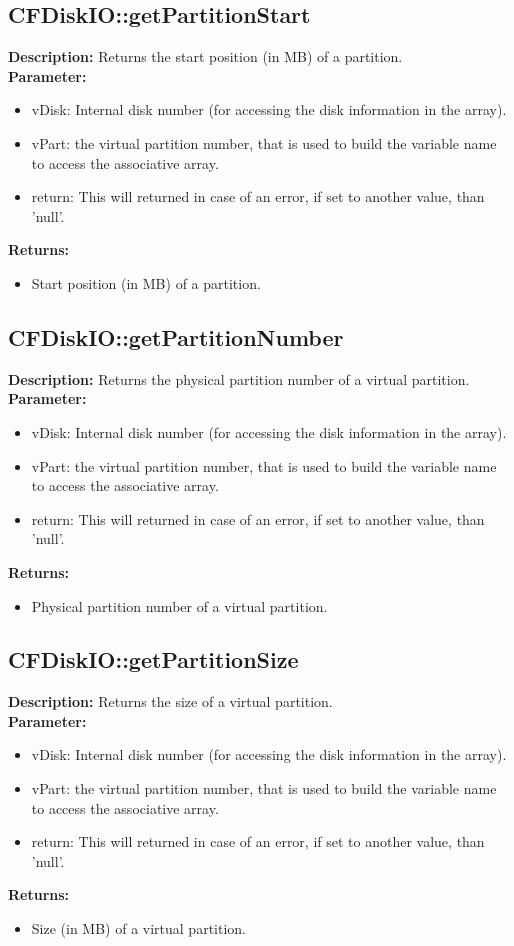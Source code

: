 \subsection{CFDiskIO::getPartitionStart}
\textbf{Description:} Returns the start position (in MB) of a partition.\\
\textbf{Parameter:}
\begin{itemize}
\item vDisk: Internal disk number (for accessing the disk information in the array).
\item vPart: the virtual partition number, that is used to build the variable name to access the associative array.
\item return: This will returned in case of an error, if set to another value, than 'null'.
\end{itemize}
\textbf{Returns:}
\begin{itemize}
\item Start position (in MB) of a partition.
\end{itemize}

\subsection{CFDiskIO::getPartitionNumber}
\textbf{Description:} Returns the physical partition number of a virtual partition.\\
\textbf{Parameter:}
\begin{itemize}
\item vDisk: Internal disk number (for accessing the disk information in the array).
\item vPart: the virtual partition number, that is used to build the variable name to access the associative array.
\item return: This will returned in case of an error, if set to another value, than 'null'.
\end{itemize}
\textbf{Returns:}
\begin{itemize}
\item Physical partition number of a virtual partition.
\end{itemize}

\subsection{CFDiskIO::getPartitionSize}
\textbf{Description:} Returns the size of a virtual partition.\\
\textbf{Parameter:}
\begin{itemize}
\item vDisk: Internal disk number (for accessing the disk information in the array).
\item vPart: the virtual partition number, that is used to build the variable name to access the associative array.
\item return: This will returned in case of an error, if set to another value, than 'null'.
\end{itemize}
\textbf{Returns:}
\begin{itemize}
\item Size (in MB) of a virtual partition.
\end{itemize}

